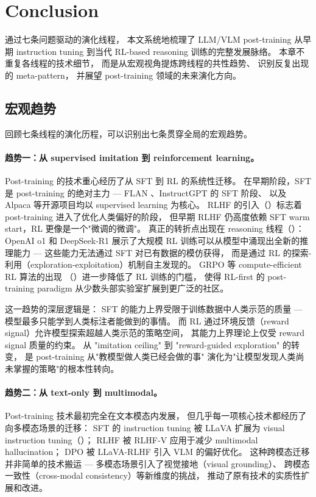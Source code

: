 \section{Conclusion}
\label{sec:t8}

通过七条问题驱动的演化线程，
本文系统地梳理了 LLM/VLM post-training 从早期 instruction tuning
到当代 RL-based reasoning 训练的完整发展脉络。
本章不重复各线程的技术细节，
而是从宏观视角提炼跨线程的共性趋势、
识别反复出现的 meta-pattern，
并展望 post-training 领域的未来演化方向。

\subsection{宏观趋势}
\label{sec:t8-trends}

回顾七条线程的演化历程，可以识别出七条贯穿全局的宏观趋势。

\paragraph{趋势一：从 supervised imitation 到 reinforcement learning。}
Post-training 的技术重心经历了从 SFT 到 RL 的系统性迁移。
在早期阶段，SFT 是 post-training 的绝对主力 ---
FLAN \cite{wei2022flan}、InstructGPT \cite{ouyang2022instructgpt} 的 SFT 阶段、
以及 Alpaca \cite{taori2023alpaca} 等开源项目均以 supervised learning 为核心。
RLHF 的引入（）标志着 post-training 进入了优化人类偏好的阶段，
但早期 RLHF 仍高度依赖 SFT warm start，RL 更像是一个"微调的微调"。
真正的转折点出现在 reasoning 线程（）：
OpenAI o1 \cite{openai2024o1} 和 DeepSeek-R1 \cite{deepseek2025r1}
展示了大规模 RL 训练可以从模型中涌现出全新的推理能力 ---
这些能力无法通过 SFT 对已有数据的模仿获得，
而是通过 RL 的探索-利用（exploration-exploitation）机制自主发现的。
GRPO \cite{shao2024grpo} 等 compute-efficient RL 算法的出现
（）进一步降低了 RL 训练的门槛，
使得 RL-first 的 post-training paradigm 从少数头部实验室扩展到更广泛的社区。

\noindent
这一趋势的深层逻辑是：
SFT 的能力上界受限于训练数据中人类示范的质量 ---
模型最多只能学到人类标注者能做到的事情。
而 RL 通过环境反馈（reward signal）允许模型探索超越人类示范的策略空间，
其能力上界理论上仅受 reward signal 质量的约束。
从 "imitation ceiling" 到 "reward-guided exploration" 的转变，
是 post-training 从"教模型做人类已经会做的事"
演化为"让模型发现人类尚未掌握的策略"的根本性转向。

\paragraph{趋势二：从 text-only 到 multimodal。}
Post-training 技术最初完全在文本模态内发展，
但几乎每一项核心技术都经历了向多模态场景的迁移：
SFT 的 instruction tuning 被 LLaVA \cite{liu2023llava} 扩展为
visual instruction tuning（）；
RLHF 被 RLHF-V \cite{sun2023rlhfv} 应用于减少 multimodal hallucination；
DPO 被 LLaVA-RLHF \cite{sun2024llava-rlhf} 引入 VLM 的偏好优化。
这种跨模态迁移并非简单的技术搬运 ---
多模态场景引入了视觉接地（visual grounding）、
跨模态一致性（cross-modal consistency）等新维度的挑战，
推动了原有技术的实质性扩展和改进。

